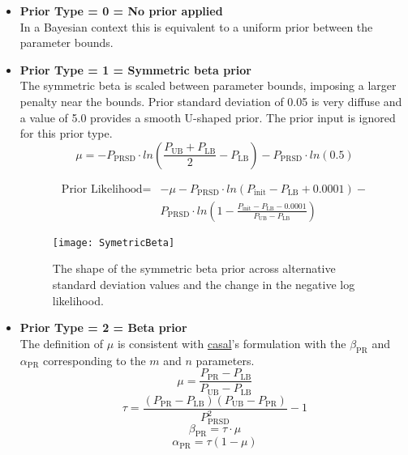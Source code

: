 \begin{itemize}
	\item  \textbf{Prior Type = 0 = No prior applied} \\ 
	In a Bayesian context this is equivalent to a uniform prior between the parameter bounds.
	
	\item  \textbf{Prior Type = 1 = Symmetric beta prior} \\ 
	The symmetric beta is scaled between parameter bounds, imposing a larger penalty near the bounds. Prior standard deviation of 0.05 is very diffuse and a value of 5.0 provides a smooth U-shaped prior. The prior input is ignored for this prior type.
	\begin{equation} 
		\mu = -P_\text{PRSD} \cdot ln\left(\frac{P_\text{UB}+P_\text{LB}}{2} - P_\text{LB} \right) - P_\text{PRSD} \cdot ln(0.5)
	\end{equation}
	
	\begin{equation}
		\begin{split}
\text{Prior Likelihood} = &-\mu -P_\text{PRSD} \cdot ln\left(P_\text{init}-P_\text{LB}+0.0001\right) - \\
& P_\text{PRSD} \cdot ln\left(1-\frac{P_\text{init}-P_\text{LB}-0.0001}{P_\text{UB}-P_\text{LB}}\right)
		\end{split}
	\end{equation}

	\begin{figure}[ht]
		\begin{center}
			\texttt{[image: SymetricBeta]}\\
		\end{center}
		\caption{The shape of the symmetric beta prior across alternative standard deviation values and the change in the negative log likelihood.}
	\end{figure}	

	
	\item \textbf{Prior Type = 2 = Beta prior} \\ 
	The definition of $\mu$ is consistent with \href{https://casal2.github.io/}{\gls{casal}}'s formulation with the $\beta_\text{PR}$ and $\alpha_\text{PR}$ corresponding to the $m$ and $n$ parameters.
	\begin{equation}
		\mu = \frac{P_\text{PR}-P_\text{LB}}{P_\text{UB}-P_\text{LB}} 
	\end{equation}
	\begin{equation}
		\tau  = \frac{(P_\text{PR}-P_\text{LB})(P_\text{UB}-P_\text{PR})}{P_\text{PRSD}^2}-1
	\end{equation}
	\begin{equation}
		\beta_\text{PR}  = \tau \cdot \mu
	\end{equation}
	\begin{equation}
		\alpha_\text{PR} = \tau (1-\mu)
	\end{equation}
	

\end{itemize}
